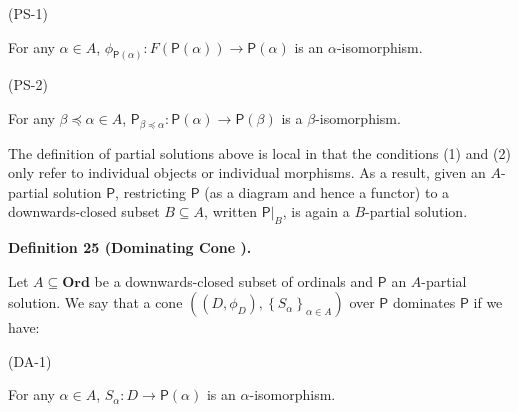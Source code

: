 \documentclass[10pt,a4paper]{article}
\begin{document}
\par\noindent  (PS-1) 
 
For any $\alpha\in A$, $\phi_{\boldsymbol{\mathsf{P}}(\alpha)}:F(\boldsymbol{\mathsf{P}}(\alpha))\to\boldsymbol{\mathsf{P}}(\alpha)$ is an $\alpha$-isomorphism.\par
 
 
 
\par\noindent  (PS-2) 
 
For any $\beta\preceq\alpha\in A$, $\boldsymbol{\mathsf{P}}_{\beta\preceq\alpha}:\boldsymbol{\mathsf{P}}(\alpha)\to\boldsymbol{\mathsf{P}}(\beta)$ is a $\beta$-isomorphism.\par
 
 
  
 
 
 
The definition of partial solutions above is local in that the conditions (1) and (2) only refer to individual objects or individual morphisms. As a result, given an $A$-partial solution $\boldsymbol{\mathsf{P}}$, restricting $\boldsymbol{\mathsf{P}}$ (as a diagram and hence a functor) to a downwards-closed subset $B\subseteq A$, written ${\left.\boldsymbol{\mathsf{P}}\right|}_{B}$, is again a $B$-partial solution.\par
 
 
 
\par\medskip\noindent\textbf{Definition 25 (Dominating Cone ).}\par
 
 
Let $A\subseteq\mathbf{Ord}$ be a downwards-closed subset of ordinals and $\boldsymbol{\mathsf{P}}$ an $A$-partial solution. We say that a cone $((D,\phi_{D}),\left\{S_{\alpha}\right\}_{\alpha\in A})$ over $\boldsymbol{\mathsf{P}}$ dominates $\boldsymbol{\mathsf{P}}$ if we have:\par
  
\par\noindent  (DA-1) 
 
For any $\alpha\in A$, $S_{\alpha}:D\to\boldsymbol{\mathsf{P}}(\alpha)$ is an $\alpha$-isomorphism.\par
 
\end{document}
